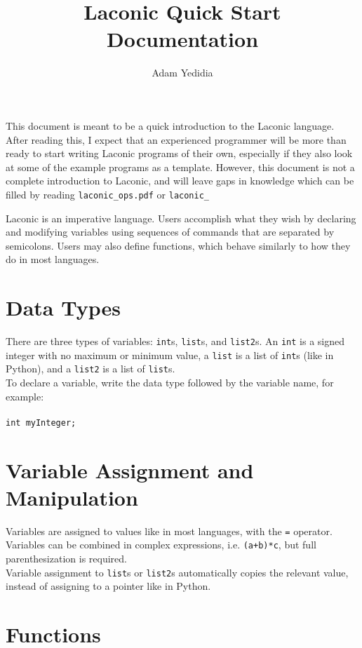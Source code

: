 \documentclass[11pt]{article}
\title{Laconic Quick Start Documentation}
\author{Adam Yedidia}
\begin{document}
    
\maketitle 

This document is meant to be a quick introduction to the Laconic language. After reading this, I expect that an experienced programmer will be more than ready to start writing Laconic programs of their own, especially if they also look at some of the example programs as a template. However, this document is not a complete introduction to Laconic, and will leave gaps in knowledge which can be filled by reading \texttt{laconic_ops.pdf} or \texttt{laconic_}

Laconic is an imperative language. Users accomplish what they wish by declaring and modifying variables using sequences of commands that are separated by semicolons. Users may also define functions, which behave similarly to how they do in most languages.

\section{Data Types}

There are three types of variables: \texttt{int}s, \texttt{list}s, and \texttt{list2}s. An \texttt{int} is a signed integer with no maximum or minimum value, a \texttt{list} is a list of \texttt{int}s (like in Python), and a \texttt{list2} is a list of \texttt{list}s. \\ 

To declare a variable, write the data type followed by the variable name, for example: \\ \\
\texttt{int myInteger;} \\ 

\section{Variable Assignment and Manipulation}

Variables are assigned to values like in most languages, with the \texttt{=} operator. Variables can be combined in complex expressions, i.e. \texttt{(a+b)*c}, but full parenthesization is required. \\

Variable assignment to \texttt{list}s or \texttt{list2}s automatically copies the relevant value, instead of assigning to a pointer like in Python.

\section{Functions}
\end{document}
